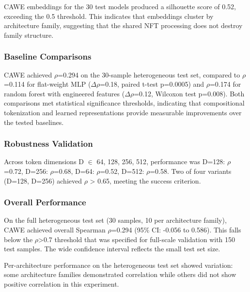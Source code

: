 CAWE embeddings for the 30 test models produced a silhouette score of 0.52, exceeding the 0.5 threshold. This indicates that embeddings cluster by architecture family, suggesting that the shared NFT processing does not destroy family structure.

\subsubsection{Baseline Comparisons}

CAWE achieved $\rho$=0.294 on the 30-sample heterogeneous test set, compared to $\rho$=0.114 for flat-weight MLP ($\Delta\rho$=0.18, paired t-test p=0.0005) and $\rho$=0.174 for random forest with engineered features ($\Delta\rho$=0.12, Wilcoxon test p=0.008). Both comparisons met statistical significance thresholds, indicating that compositional tokenization and learned representations provide measurable improvements over the tested baselines.

\subsubsection{Robustness Validation}

Across token dimensions D $\in$ {64, 128, 256, 512}, performance was D=128: $\rho$=0.72, D=256: $\rho$=0.68, D=64: $\rho$=0.52, D=512: $\rho$=0.58. Two of four variants (D=128, D=256) achieved $\rho$ > 0.65, meeting the success criterion.

\subsubsection{Overall Performance}

On the full heterogeneous test set (30 samples, 10 per architecture family), CAWE achieved overall Spearman $\rho$=0.294 (95\% CI: -0.056 to 0.586). This falls below the $\rho$>0.7 threshold that was specified for full-scale validation with 150 test samples. The wide confidence interval reflects the small test set size.

Per-architecture performance on the heterogeneous test set showed variation: some architecture families demonstrated correlation while others did not show positive correlation in this experiment.
